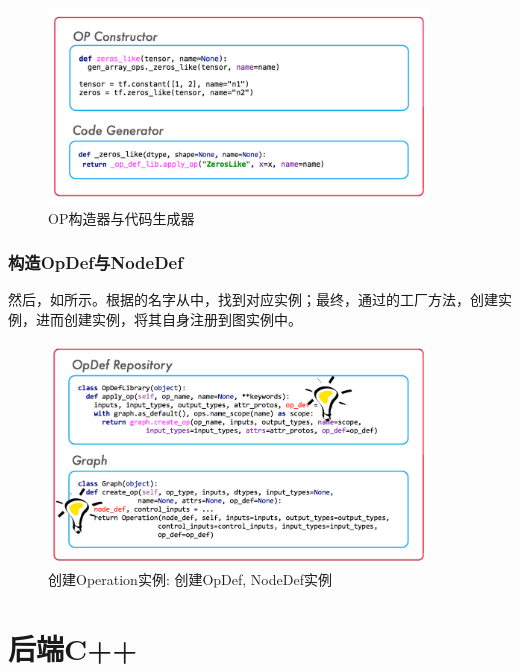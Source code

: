 \begin{content}
\begin{figure}[H]
\centering
\includegraphics[width=0.9\textwidth]{figures/py-op-constructor.png}
\caption{OP构造器与代码生成器}
 \label{fig:py-op-constructor}
\end{figure}

\subsubsection{构造OpDef与NodeDef}

然后，如所示。根据的名字从中，找到对应实例；最终，通过的工厂方法，创建实例，进而创建实例，将其自身注册到图实例中。

\begin{figure}[H]
\centering
\includegraphics[width=0.9\textwidth]{figures/py-graph-create-op.png}
\caption{创建Operation实例: 创建OpDef, NodeDef实例}
 \label{fig:py-graph-create-op}
\end{figure}

\end{content}

\section{后端C++}

